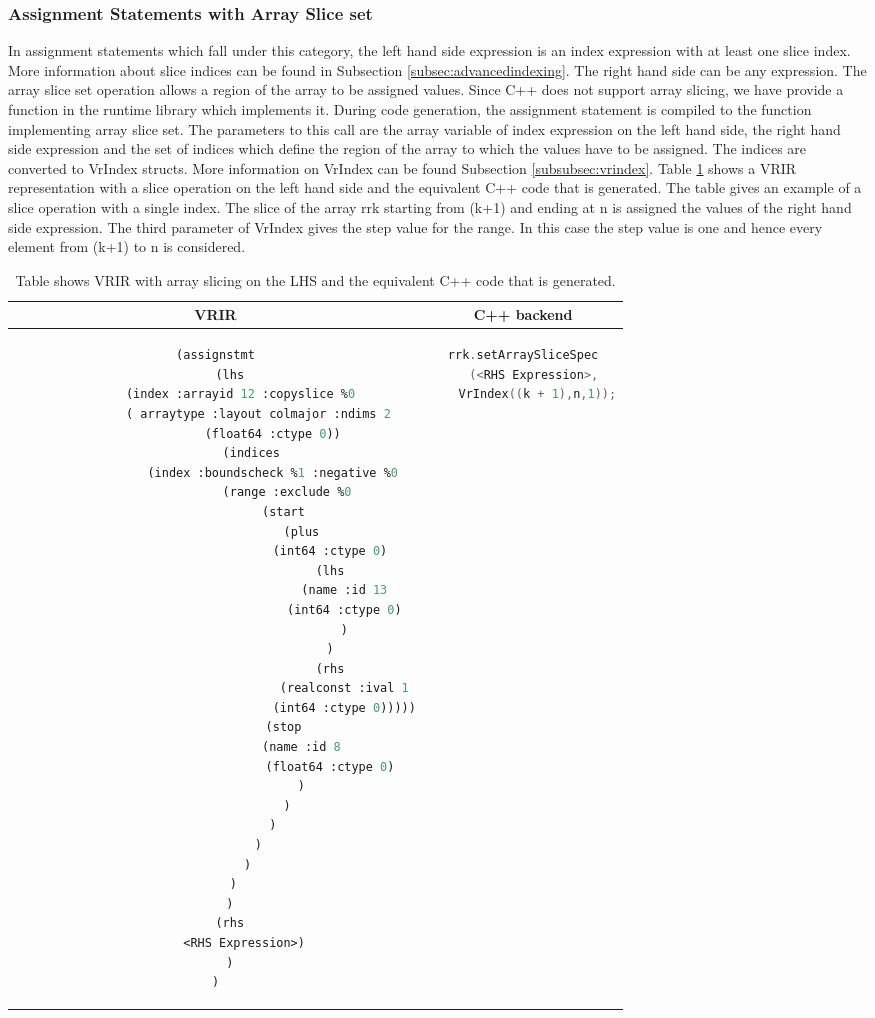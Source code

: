 \subsubsection{Assignment Statements with Array Slice set}
In assignment statements which fall under this category, the left hand side expression is an index expression with at least one slice index. More information about slice indices can be found in Subsection \ref{subsec:advancedindexing}. The right hand side can be any expression. The array slice set operation allows a region of the array to be assigned values. Since C++ does not support array slicing, we have provide a function in the runtime library which implements it. During code generation, the assignment statement is compiled to the function implementing array slice set. The parameters to this call are the array variable of index expression on the left hand side, the right hand side expression and the set of indices which define the region of the array to which the values have to be assigned. The indices are converted to VrIndex structs. More information on VrIndex can be found Subsection \ref{subsubsec:vrindex}. Table \ref{tab:sliceAssign} shows a VRIR representation with a slice operation on the left hand side and the equivalent C++ code that is generated. The table gives an example of a slice operation with a single index. The slice of the array rrk starting from (k+1) and ending at n is assigned the values of the right hand side expression. The third parameter of VrIndex gives the step value for the range. In this case the step value is one and hence every element from (k+1)  to n is considered. 
\begin{table}[htbp]
\begin{tabular}{|c|c|}
\hline
VRIR & C++ backend \\
\hline
{
\begin{lstlisting}[language=lisp, frame=none, numbers=none]
(assignstmt
	(lhs
		(index :arrayid 12 :copyslice %0 
			( arraytype :layout colmajor :ndims 2
			 	(float64 :ctype 0))
		  (indices
				(index :boundscheck %1 :negative %0
			 		(range :exclude %0
			  		(start 
			   			(plus
								(int64 :ctype 0)
								(lhs
				 					(name :id 13
				  					(int64 :ctype 0)
									)
								)
								(rhs
				 					(realconst :ival 1
				  					(int64 :ctype 0)))))
			  		(stop 
			   			(name :id 8
								(float64 :ctype 0)
			   			)
			  		)
			 	)
			)
		 )
	 )
	)
	(rhs
		<RHS Expression>)
	)
)
\end{lstlisting}
} & 
{
\begin{lstlisting}[language=c,frame=none, numbers=none]
rrk.setArraySliceSpec
	(<RHS Expression>, 
	VrIndex((k + 1),n,1));
		\end{lstlisting}
} \\
\hline
\end{tabular}
\caption[Assignment with array slice set]{Table shows VRIR with array slicing on the LHS and the equivalent C++ code that is generated.}
\label{tab:sliceAssign}
\end{table}

